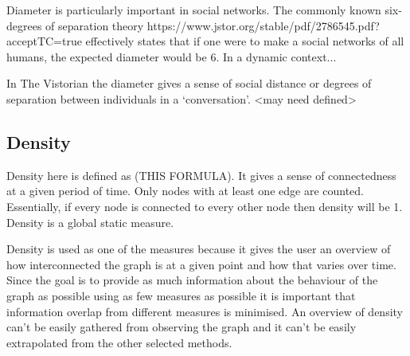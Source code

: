 Diameter is particularly important in social networks. The commonly known six-degrees of separation theory https://www.jstor.org/stable/pdf/2786545.pdf?acceptTC=true effectively states that if one were to make a social networks of all humans, the expected diameter would be 6. In a dynamic context... 

In The Vistorian the diameter gives a sense of social distance or degrees of separation between individuals in a ‘conversation’. <may need defined> 

\subsection{Density}
Density here is defined as (THIS FORMULA). It gives a sense of connectedness at a given period of time. Only nodes with at least one edge are counted. Essentially, if every node is connected to every other node then density will be 1. Density is a global static measure.

Density is used as one of the measures because it gives the user an overview of how interconnected the graph is at a given point and how that varies over time. Since the goal is to provide as much information about the behaviour of the graph as possible using as few measures as possible it is important that information overlap from different measures is minimised. An overview of density can't be easily gathered from observing the graph and it can't be easily extrapolated from the other selected methods.

